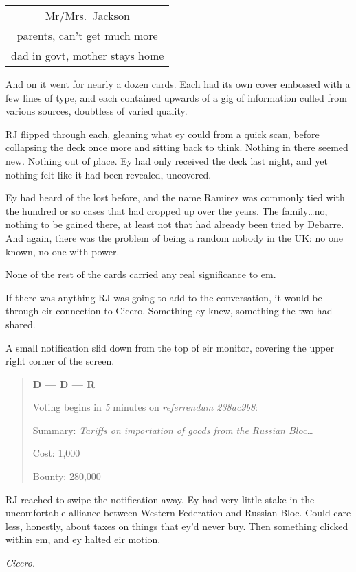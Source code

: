 \begin{longtable}[]{@{}c@{}}
\toprule
\endhead
Mr/Mrs.~Jackson\tabularnewline
parents, can't get much more\tabularnewline
dad in govt, mother stays home\tabularnewline
\bottomrule
\end{longtable}

And on it went for nearly a dozen cards. Each had its own cover embossed with a few lines of type, and each contained upwards of a gig of information culled from various sources, doubtless of varied quality.

RJ flipped through each, gleaning what ey could from a quick scan, before collapsing the deck once more and sitting back to think. Nothing in there seemed new. Nothing out of place. Ey had only received the deck last night, and yet nothing felt like it had been revealed, uncovered.

Ey had heard of the lost before, and the name Ramirez was commonly tied with the hundred or so cases that had cropped up over the years. The family\ldots{}no, nothing to be gained there, at least not that had already been tried by Debarre. And again, there was the problem of being a random nobody in the UK: no one known, no one with power.

None of the rest of the cards carried any real significance to em.

If there was anything RJ was going to add to the conversation, it would be through eir connection to Cicero. Something ey knew, something the two had shared.

A small notification slid down from the top of eir monitor, covering the upper right corner of the screen.

\begin{quote}
\textbf{D --- D --- R}

Voting begins in \emph{5} minutes on \emph{referrendum 238ac9b8}:

Summary: \emph{Tariffs on importation of goods from the Russian Bloc\ldots{}}

Cost: 1,000

Bounty: 280,000
\end{quote}

RJ reached to swipe the notification away. Ey had very little stake in the uncomfortable alliance between Western Federation and Russian Bloc. Could care less, honestly, about taxes on things that ey'd never buy. Then something clicked within em, and ey halted eir motion.

\emph{Cicero.}

